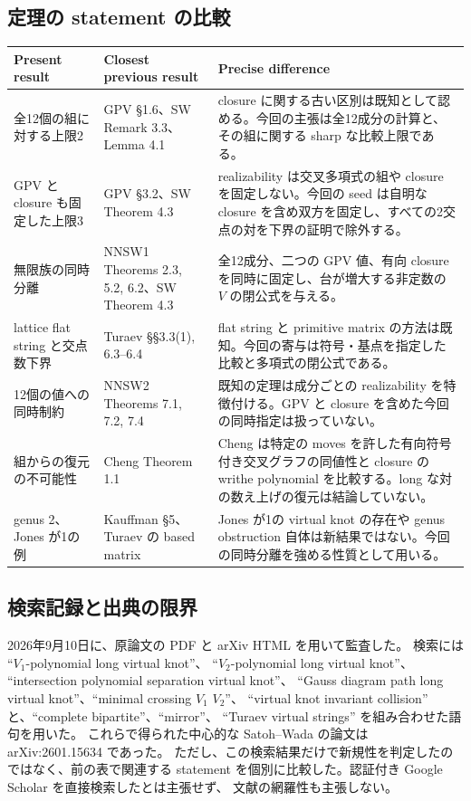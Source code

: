 \documentclass[12pt]{amsart}
\theoremstyle{definition}
\theoremstyle{remark}
\numberwithin{equation}{section}
\begin{document}
\subsection{定理の statement の比較}
\begin{longtable}{p{}p{}p{}}
\toprule Present result&Closest previous result&Precise difference\\\midrule
\endhead
全12個の組に対する上限2&GPV \S1.6、SW Remark 3.3、Lemma 4.1&closure に関する古い区別は既知として認める。今回の主張は全12成分の計算と、その組に関する sharp な比較上限である。\\[3pt]
GPV と closure も固定した上限3&GPV \S3.2、SW Theorem 4.3&realizability は交叉多項式の組や closure を固定しない。今回の seed は自明な closure を含め双方を固定し、すべての2交点の対を下界の証明で除外する。\\[3pt]
無限族の同時分離&NNSW1 Theorems 2.3, 5.2, 6.2、SW Theorem 4.3&全12成分、二つの GPV 値、有向 closure を同時に固定し、台が増大する非定数の $V$ の閉公式を与える。\\[3pt]
lattice flat string と交点数下界&Turaev \S\S3.3(1), 6.3--6.4&flat string と primitive matrix の方法は既知。今回の寄与は符号・基点を指定した比較と多項式の閉公式である。\\[3pt]
12個の値への同時制約&NNSW2 Theorems 7.1, 7.2, 7.4&既知の定理は成分ごとの realizability を特徴付ける。GPV と closure を含めた今回の同時指定は扱っていない。\\[3pt]
組からの復元の不可能性&Cheng Theorem 1.1&Cheng は特定の moves を許した有向符号付き交叉グラフの同値性と closure の writhe polynomial を比較する。long な対の数え上げの復元は結論していない。\\[3pt]
genus 2、Jones が1の例&Kauffman \S5、Turaev の based matrix&Jones が1の virtual knot の存在や genus obstruction 自体は新結果ではない。今回の同時分離を強める性質として用いる。\\
\bottomrule
\end{longtable}

\subsection{検索記録と出典の限界}
2026年9月10日に、原論文の PDF と arXiv HTML を用いて監査した。
検索には ``$V_1$-polynomial long virtual knot''、
``$V_2$-polynomial long virtual knot''、
``intersection polynomial separation virtual knot''、
``Gauss diagram path long virtual knot''、``minimal crossing $V_1$ $V_2$''、
``virtual knot invariant collision'' と、``complete bipartite''、``mirror''、
``Turaev virtual strings'' を組み合わせた語句を用いた。
これらで得られた中心的な Satoh--Wada の論文は arXiv:2601.15634 であった。
ただし、この検索結果だけで新規性を判定したのではなく、前の表で関連する
statement を個別に比較した。認証付き Google Scholar を直接検索したとは主張せず、
文献の網羅性も主張しない。
\end{document}
